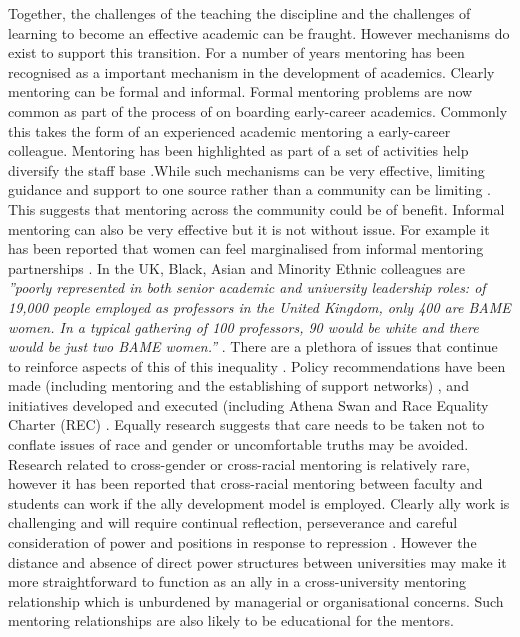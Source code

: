 \documentclass[sigconf]{acmart}
\begin{document}
Together, the challenges of the teaching the discipline and the challenges of learning to become an effective academic can be fraught. However mechanisms do exist to support this transition. For a number of years  mentoring has been recognised as a important mechanism in the development of academics. Clearly mentoring can be formal and informal. Formal mentoring problems are now common as part of the process of on boarding early-career academics.  Commonly this takes the form of an experienced academic mentoring a early-career colleague. Mentoring has been highlighted as part of a set of activities help diversify the staff base \cite{Golubchik2018}.While such mechanisms can be very effective, limiting guidance and support to one source rather than a community can be limiting \cite{deJanasz}. This suggests that mentoring across the community could be of benefit.  Informal mentoring can also be very effective but it is not without issue. For example it has been reported that women can feel marginalised from informal mentoring partnerships \cite{gibson2006mentoring}.   In the UK, Black, Asian and Minority Ethnic colleagues are \textit{''poorly represented in both senior academic and university leadership roles: of 19,000 people employed as professors in the United Kingdom, only 400 are BAME women. In a typical gathering of 100 professors, 90 would be white and there would be just two BAME women.''} \cite[p.~I]{UniversitiesUK19}. There are a plethora of issues that continue to reinforce aspects of this of this inequality \cite{arday20}. Policy recommendations have been made (including mentoring and the establishing of support networks) \cite{bhopal2014experiences}, and initiatives developed and executed (including Athena Swan \cite{AthenaSwan} and Race Equality Charter (REC)  \cite{REC}. Equally research suggests that care needs to be taken not to conflate issues of race and gender \cite{Bhopal19} or uncomfortable truths may be avoided. Research related to cross-gender or cross-racial mentoring is relatively rare, however it has been reported that cross-racial mentoring between faculty and students can work \cite{reddick2016don} if the ally development model is employed. Clearly ally work is challenging and will require continual reflection, perseverance and careful consideration of power and positions in response to repression \cite{Patton2015}. However the distance and absence of direct power structures between universities may make it more straightforward to function as an ally in a cross-university mentoring relationship which is unburdened by managerial or organisational concerns. Such mentoring relationships are also likely to be educational for the mentors.
\end{document}
